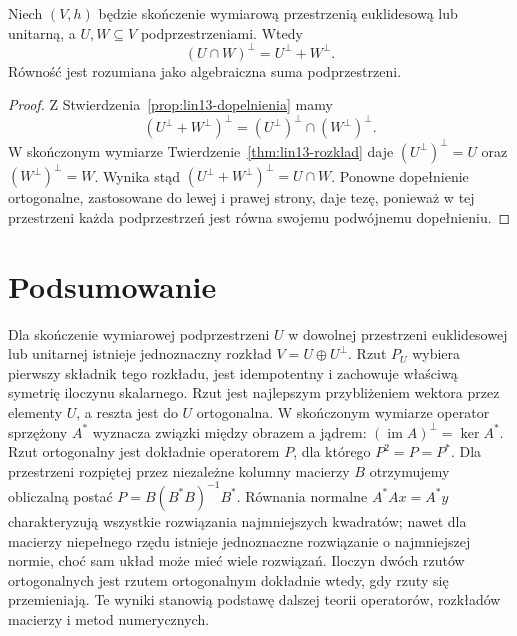 \begin{stwierdzenie}
\label{prop:lin13-perp-intersection}
Niech \((V,h)\) będzie
skończenie wymiarową przestrzenią
euklidesową lub unitarną,
a \(U,W\subseteq V\)
podprzestrzeniami.
Wtedy
\[
 (U\cap W)^\perp=U^\perp+W^\perp.
\]
Równość jest rozumiana jako
algebraiczna suma podprzestrzeni.
\end{stwierdzenie}
\begin{proof}
Z
Stwierdzenia~\ref{prop:lin13-dopelnienia}
mamy
\[
 (U^\perp+W^\perp)^\perp
 =(U^\perp)^\perp\cap(W^\perp)^\perp.
\]
W skończonym wymiarze
Twierdzenie~\ref{thm:lin13-rozklad}
daje
\((U^\perp)^\perp=U\)
oraz
\((W^\perp)^\perp=W\).
Wynika stąd
\((U^\perp+W^\perp)^\perp=U\cap W\).
Ponowne dopełnienie
ortogonalne, zastosowane
do lewej i prawej strony,
daje tezę, ponieważ w tej
przestrzeni każda podprzestrzeń
jest równa swojemu
podwójnemu dopełnieniu.
\end{proof}

\section{Podsumowanie}
\label{sec:lin13-podsumowanie}

Dla skończenie wymiarowej
podprzestrzeni \(U\)
w dowolnej przestrzeni
euklidesowej lub unitarnej
istnieje jednoznaczny
rozkład \(V=U\oplus U^\perp\).
Rzut \(P_U\) wybiera pierwszy
składnik tego rozkładu,
jest idempotentny i zachowuje
właściwą symetrię iloczynu
skalarnego. Rzut jest
najlepszym przybliżeniem
wektora przez elementy \(U\),
a reszta jest do \(U\)
ortogonalna.
W skończonym wymiarze
operator sprzężony \(A^*\)
wyznacza związki między
obrazem a jądrem:
\((\operatorname{im}A)^\perp=\ker A^*\).
Rzut ortogonalny jest dokładnie
operatorem \(P\), dla którego
\(P^2=P=P^*\).
Dla przestrzeni rozpiętej przez
niezależne kolumny macierzy \(B\)
otrzymujemy obliczalną
postać \(P=B(B^*B)^{-1}B^*\).
Równania normalne
\(A^*Ax=A^*y\) charakteryzują
wszystkie rozwiązania
najmniejszych kwadratów;
nawet dla macierzy niepełnego
rzędu istnieje jednoznaczne
rozwiązanie o najmniejszej
normie, choć sam układ
może mieć wiele rozwiązań.
Iloczyn dwóch rzutów
ortogonalnych jest rzutem
ortogonalnym dokładnie wtedy,
gdy rzuty się przemieniają.
Te wyniki stanowią podstawę
dalszej teorii operatorów,
rozkładów macierzy i metod
numerycznych.
